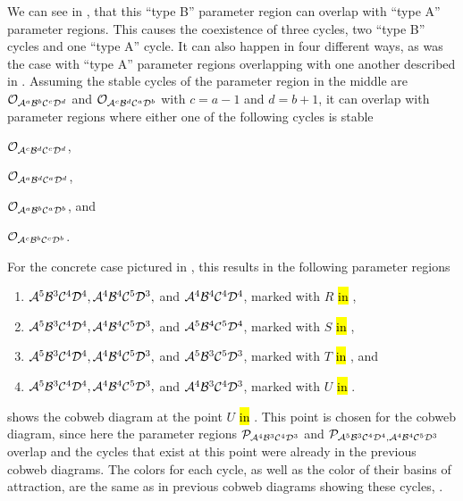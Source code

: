 We can see in , that this ``type B'' parameter region can overlap with ``type A'' parameter regions.
This causes the coexistence of three cycles, two ``type B'' cycles and one ``type A'' cycle.
It can also happen in four different ways, as was the case with ``type A'' parameter regions overlapping with one another described in .
Assuming the stable cycles of the parameter region in the middle are $\mathcal{O}_{\mathcal{A}^a\mathcal{B}^b\mathcal{C}^c\mathcal{D}^d}$ and $\mathcal{O}_{\mathcal{A}^c\mathcal{B}^d\mathcal{C}^a\mathcal{D}^b}$ with $c = a - 1$ and $d = b + 1$, it can overlap with parameter regions where either one of the following cycles is stable
\begin{enumerate*}
	\item $\mathcal{O}_{\mathcal{A}^c\mathcal{B}^d\mathcal{C}^c\mathcal{D}^d}$,
	\item $\mathcal{O}_{\mathcal{A}^a\mathcal{B}^d\mathcal{C}^a\mathcal{D}^d}$,
	\item $\mathcal{O}_{\mathcal{A}^a\mathcal{B}^b\mathcal{C}^a\mathcal{D}^b}$, and
	\item $\mathcal{O}_{\mathcal{A}^c\mathcal{B}^b\mathcal{C}^c\mathcal{D}^b}$.
\end{enumerate*}
For the concrete case pictured in , this results in the following parameter regions
\begin{enumerate}
	\item $\mathcal{A}^5\mathcal{B}^3\mathcal{C}^4\mathcal{D}^4, \mathcal{A}^4\mathcal{B}^4\mathcal{C}^5\mathcal{D}^3,$ and $\mathcal{A}^4\mathcal{B}^4\mathcal{C}^4\mathcal{D}^4$, marked with $R$ \hl{in} ,
	\item $\mathcal{A}^5\mathcal{B}^3\mathcal{C}^4\mathcal{D}^4, \mathcal{A}^4\mathcal{B}^4\mathcal{C}^5\mathcal{D}^3,$ and $\mathcal{A}^5\mathcal{B}^4\mathcal{C}^5\mathcal{D}^4$, marked with $S$ \hl{in} ,
	\item $\mathcal{A}^5\mathcal{B}^3\mathcal{C}^4\mathcal{D}^4, \mathcal{A}^4\mathcal{B}^4\mathcal{C}^5\mathcal{D}^3,$ and $\mathcal{A}^5\mathcal{B}^3\mathcal{C}^5\mathcal{D}^3$, marked with $T$ \hl{in} , and
	\item $\mathcal{A}^5\mathcal{B}^3\mathcal{C}^4\mathcal{D}^4, \mathcal{A}^4\mathcal{B}^4\mathcal{C}^5\mathcal{D}^3,$ and $\mathcal{A}^4\mathcal{B}^3\mathcal{C}^4\mathcal{D}^3$, marked with $U$ \hl{in} .
\end{enumerate}

 shows the cobweb diagram at the point $U$ \hl{in} .
This point is chosen for the cobweb diagram, since here the parameter regions $\mathcal{P}_{\mathcal{A}^4\mathcal{B}^3\mathcal{C}^4\mathcal{D}^3}$ and $\mathcal{P}_{\mathcal{A}^5\mathcal{B}^3\mathcal{C}^4\mathcal{D}^4, \mathcal{A}^4\mathcal{B}^4\mathcal{C}^5\mathcal{D}^3}$ overlap and the cycles that exist at this point were already in the previous cobweb diagrams.
The colors for each cycle, as well as the color of their basins of attraction, are the same as in previous cobweb diagrams showing these cycles, .


